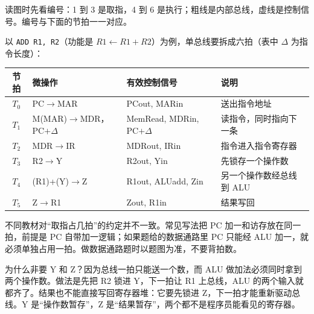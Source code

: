 \begin{center}
\end{center}

读图时先看编号：1 到 3 是取指，4 到 6 是执行；粗线是内部总线，虚线是控制信号。编号与下面的节拍一一对应。

\newpage
以 \texttt{ADD R1, R2}（功能是 $R1\leftarrow R1+R2$）为例，单总线要拆成六拍（表中 $\Delta$ 为指令长度）：

\begin{center}
\begin{tabular}{@{}clll@{}}
\toprule
节拍 & 微操作 & 有效控制信号 & 说明 \\
\midrule
$T_0$ & PC$\to$MAR & PCout, MARin & 送出指令地址 \\
$T_1$ & M(MAR)$\to$MDR，PC$+\Delta$ & MemRead, MDRin, PC$+\Delta$ & 读指令，同时指向下一条 \\
$T_2$ & MDR$\to$IR & MDRout, IRin & 指令进入指令寄存器 \\
$T_3$ & R2$\to$Y & R2out, Yin & 先锁存一个操作数 \\
$T_4$ & (R1)+(Y)$\to$Z & R1out, ALUadd, Zin & 另一个操作数经总线到 ALU \\
$T_5$ & Z$\to$R1 & Zout, R1in & 结果写回 \\
\bottomrule
\end{tabular}
\end{center}

\begin{attention}
不同教材对“取指占几拍”的约定并不一致。常见写法把 PC 加一和访存放在同一拍，前提是 PC 自带加一逻辑；如果题给的数据通路里 PC 只能经 ALU 加一，就必须单独占用一拍。做数据通路题时以题图为准，不要背拍数。
\end{attention}

为什么非要 Y 和 Z？因为总线一拍只能送一个数，而 ALU 做加法必须同时拿到两个操作数。做法是先把 R2 锁进 Y，下一拍让 R1 上总线，ALU 的两个输入就都齐了。结果也不能直接写回寄存器堆：它要先锁进 Z，下一拍才能重新驱动总线。Y 是“操作数暂存”，Z 是“结果暂存”，两个都不是程序员能看见的寄存器。

